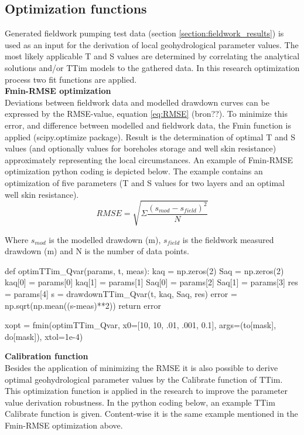 \subsection{Optimization functions}
Generated fieldwork pumping test data (section \ref{section:fieldwork_results}) is used as an input for the derivation of local geohydrological parameter values. The most likely applicable T and S values are determined by correlating the analytical solutions and/or TTim models to the gathered data. In this research optimization process two fit functions are applied. \\

\textbf{Fmin-RMSE optimization}\\
Deviations between fieldwork data and modelled drawdown curves can be expressed by the RMSE-value, equation \ref{eq:RMSE} (bron??). To minimize this error, and difference between modelled and fieldwork data, the Fmin function is applied (scipy.optimize package). Result is the determination of optimal T and S values (and optionally values for boreholes storage and well skin resistance) approximately representing the local circumstances. An example of Fmin-RMSE optimization python coding is depicted below. The example contains an optimization of five parameters (T and S values for two layers and an optimal well skin resistance). \\ 

\begin{equation}
\label{eq:RMSE}
 RMSE = \sqrt{\Sigma\frac{(s_{mod}-s_{field})^{2}}{N}}
\end{equation}

Where $s_{mod}$ is the modelled drawdown (m), $s_{field}$ is the fieldwork measured drawdown (m) and N is the number of data points. \\
 
\begin{python}[h!]
def optimTTim_Qvar(params, t, meas):
    kaq = np.zeros(2)
    Saq = np.zeros(2)
    kaq[0] = params[0]             
    kaq[1] = params[1]
    Saq[0] = params[2]
    Saq[1] = params[3]
    res = params[4]
    s = drawdownTTim_Qvar(t, kaq, Saq, res)
    error = np.sqrt(np.mean((s-meas)**2)) 
    return error

xopt = fmin(optimTTim_Qvar, x0=[10, 10, .01, .001, 0.1], args=(to[mask], do[mask]), xtol=1e-4)
\end{python}
\bigskip

\textbf{Calibration function}\\
Besides the application of minimizing the RMSE it is also possible to derive optimal geohydrological parameter values by the Calibrate function of TTim. This optimization function is applied in the research to improve the parameter value derivation robustness. In the python coding below, an example TTim Calibrate function is given. Content-wise it is the same example mentioned in the Fmin-RMSE optimization above.\\ 

